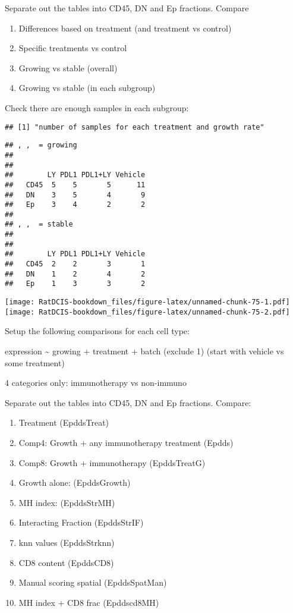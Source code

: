 \documentclass[
]{book}
\providecommand{\tightlist}{%
  \setlength{\itemsep}{0pt}\setlength{\parskip}{0pt}}
\begin{document}
Separate out the tables into CD45, DN and Ep fractions. Compare

\begin{enumerate}
\def\labelenumi{\arabic{enumi}.}
\tightlist
\item
  Differences based on treatment (and treatment vs control)
\item
  Specific treatments vs control
\item
  Growing vs stable (overall)
\item
  Growing vs stable (in each subgroup)
\end{enumerate}

Check there are enough samples in each subgroup:

\begin{verbatim}
## [1] "number of samples for each treatment and growth rate"
\end{verbatim}

\begin{verbatim}
## , ,  = growing
## 
##       
##        LY PDL1 PDL1+LY Vehicle
##   CD45  5    5       5      11
##   DN    3    5       4       9
##   Ep    3    4       2       2
## 
## , ,  = stable
## 
##       
##        LY PDL1 PDL1+LY Vehicle
##   CD45  2    2       3       1
##   DN    1    2       4       2
##   Ep    1    3       3       2
\end{verbatim}

\texttt{[image: RatDCIS-bookdown\_files/figure-latex/unnamed-chunk-75-1.pdf]} \texttt{[image: RatDCIS-bookdown\_files/figure-latex/unnamed-chunk-75-2.pdf]}

Setup the following comparisons for each cell type:

expression \textasciitilde{} growing + treatment + batch (exclude 1) (start with vehicle vs some treatment)

4 categories only: immunotherapy vs non-immuno

Separate out the tables into CD45, DN and Ep fractions. Compare:

\begin{enumerate}
\def\labelenumi{\arabic{enumi}.}
\tightlist
\item
  Treatment (EpddsTreat)
\item
  Comp4: Growth + any immunotherapy treatment (Epdds)
\item
  Comp8: Growth + immunotherapy (EpddsTreatG)
\item
  Growth alone: (EpddsGrowth)
\item
  MH index: (EpddsStrMH)
\item
  Interacting Fraction (EpddsStrIF)
\item
  knn values (EpddsStrknn)
\item
  CD8 content (EpddsCD8)
\item
  Manual scoring spatial (EpddsSpatMan)
\item
  MH index + CD8 frac (Epddscd8MH)
\end{enumerate}
\end{document}
